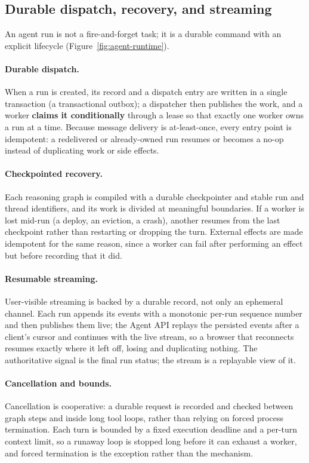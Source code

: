 \subsection{Durable dispatch, recovery, and streaming}

An agent run is not a fire-and-forget task; it is a durable command with an
explicit lifecycle (Figure~\ref{fig:agent-runtime}).

\paragraph{Durable dispatch.} When a run is created, its record and a dispatch
entry are written in a single transaction (a transactional outbox); a dispatcher
then publishes the work, and a worker \textbf{claims it conditionally} through a
lease so that exactly one worker owns a run at a time. Because message delivery is
at-least-once, every entry point is idempotent: a redelivered or already-owned run
resumes or becomes a no-op instead of duplicating work or side effects.

\paragraph{Checkpointed recovery.} Each reasoning graph is compiled with a durable
checkpointer and stable run and thread identifiers, and its work is divided at
meaningful boundaries. If a worker is lost mid-run (a deploy, an eviction, a
crash), another resumes from the last checkpoint rather than restarting or dropping
the turn. External effects are made idempotent for the same reason, since a worker
can fail after performing an effect but before recording that it did.

\paragraph{Resumable streaming.} User-visible streaming is backed by a durable
record, not only an ephemeral channel. Each run appends its events with a monotonic
per-run sequence number and then publishes them live; the Agent API replays the
persisted events after a client's cursor and continues with the live stream, so a
browser that reconnects resumes exactly where it left off, losing and duplicating
nothing. The authoritative signal is the final run status; the stream is a
replayable view of it.

\paragraph{Cancellation and bounds.} Cancellation is cooperative: a durable request
is recorded and checked between graph steps and inside long tool loops, rather than
relying on forced process termination. Each turn is bounded by a fixed execution
deadline and a per-turn context limit, so a runaway loop is stopped long before it
can exhaust a worker, and forced termination is the exception rather than the
mechanism.

